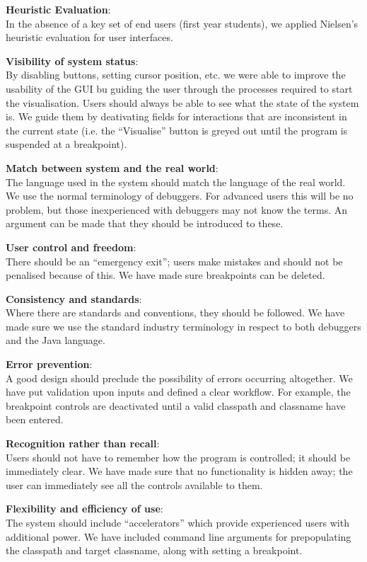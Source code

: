 \documentclass[11pt, a4paper]{report}
\begin{document}
{\bfseries Heuristic Evaluation}: \\
In the absence of a key set of end users (first year students), we applied Nielsen’s heuristic evaluation for user interfaces.

{\bfseries Visibility of system status}: \\
By disabling buttons, setting cursor position, etc. we were able to improve the usability of the GUI bu guiding the user through the processes required to start the visualisation. Users should always be able to see what the state of the system is. We guide them by deativating fields for interactions that are inconsistent in the current state (i.e. the “Visualise” button is greyed out until the program is suspended at a breakpoint).

{\bfseries Match between system and the real world}: \\
The language used in the system should match the language of the real world. We use the normal terminology of debuggers. For advanced users this will be no problem, but those inexperienced with debuggers may not know the terms. An argument can be made that they should be introduced to these.

{\bfseries User control and freedom}: \\
There should be an “emergency exit”; users make mistakes and should not be penalised because of this. We have made sure breakpoints can be deleted.

{\bfseries Consistency and standards}: \\
Where there are standards and conventions, they should be followed. We have made sure we use the standard industry terminology in respect to both debuggers and the Java language.

{\bfseries Error prevention}: \\
A good design should preclude the possibility of errors occurring altogether. We have put validation upon inputs and defined a clear workflow. For example, the breakpoint controls are deactivated until a valid classpath and classname have been entered.

{\bfseries Recognition rather than recall}: \\
Users should not have to remember how the program is controlled; it should be immediately clear. We have made sure that no functionality is hidden away; the user can immediately see all the controls available to them.

{\bfseries Flexibility and efficiency of use}: \\
The system should include “accelerators” which provide experienced users with additional power. We have included command line arguments for prepopulating the classpath and target classname, along with setting a breakpoint.
\end{document}
